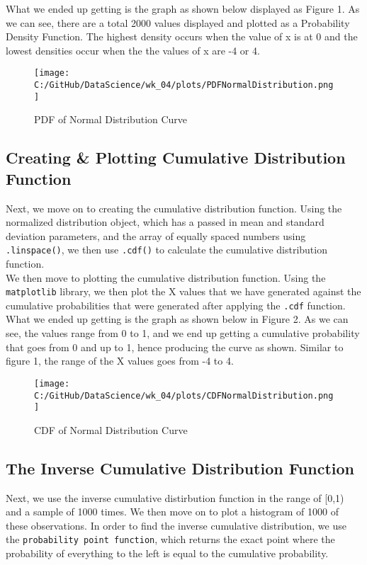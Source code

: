 \documentclass[a4paper,twocolumn]{article}
\begin{document}
What we ended up getting is the graph as shown below displayed as Figure 1. As we can see, there are a total 2000 
values displayed and plotted as a Probability Density Function. The highest density occurs when the value of x is at 
0 and the lowest densities occur when the the values of x are -4 or 4.

\begin{figure}[htbp] 
    \centering
    \noindent
    \texttt{[image: C:/GitHub/DataScience/wk\_04/plots/PDFNormalDistribution.png]}
    \caption{PDF of Normal Distribution Curve} 
\end{figure}

\newpage

\subsection{Creating \& Plotting  Cumulative Distribution Function}
Next, we move on to creating the cumulative distribution function. Using the normalized distribution object, which 
has a passed in mean and standard deviation parameters, and the array of equally spaced numbers using
\texttt{.linspace()}, we then use \texttt{.cdf()} to calculate the cumulative distribution function. \\

We then move to plotting the cumulative distribution function. Using the \texttt{matplotlib} library, we then plot the 
X values that we have generated against the cumulative probabilities that were generated after applying the 
\texttt{.cdf} function. \\

What we ended up getting is the graph as shown below in Figure 2. As we can see, the values range from 0 to 1, 
and we end up getting a cumulative probability that goes from 0 and up to 1, hence producing the curve as shown.
Similar to figure 1, the range of the X values goes from -4 to 4.


\begin{figure}[htbp] 
    \centering
    \noindent
    \texttt{[image: C:/GitHub/DataScience/wk\_04/plots/CDFNormalDistribution.png]}
    \caption{CDF of Normal Distribution Curve} 
\end{figure}

\subsection{The Inverse Cumulative Distribution Function}
Next, we use the inverse cumulative distirbution function in the range of [0,1) and a sample of 1000 times. 
We then move on to plot a histogram of 1000 of these observations.  In order to find the inverse cumulative 
distribution, we use the \texttt{probability point function}, which returns the exact point where the probability of 
everything to the left is equal to the cumulative probability. \\
\end{document}

